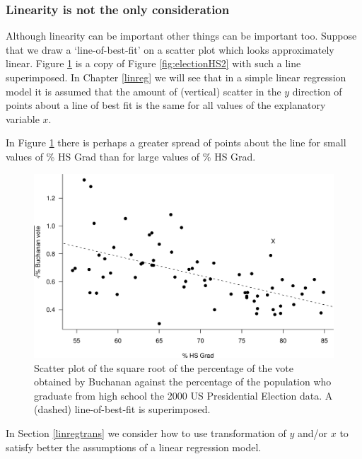 \documentclass[
  11pt,
  british,
  openany, a4paper]{book}
\begin{document}
\hypertarget{linearity-is-not-the-only-consideration}{%
\subsubsection*{Linearity is not the only consideration}\label{linearity-is-not-the-only-consideration}}

Although linearity can be important other things can be important too. Suppose that we draw a `line-of-best-fit' on a scatter plot which looks approximately linear. Figure \ref{fig:electionHS3} is a copy of Figure \ref{fig:electionHS2} with such a line superimposed. In Chapter \ref{linreg} we will see that in a simple linear regression model it is assumed that the amount of (vertical) scatter in the \(y\) direction of points about a line of best fit is the same for all values of the explanatory variable \(x\).

In Figure \ref{fig:electionHS3} there is perhaps a greater spread of points about the line for small values of \% HS Grad than for large values of \% HS Grad.

\begin{figure}

{\centering \includegraphics[width=0.75\linewidth]{images/election_HS3} 

}

\caption{Scatter plot of the square root of the percentage of the vote obtained by Buchanan against the percentage of the population who graduate from high school the 2000 US Presidential Election data.  A (dashed) line-of-best-fit is superimposed.}\label{fig:electionHS3}
\end{figure}

In Section \ref{linregtrans} we consider how to use transformation of \(y\) and/or \(x\) to satisfy better the assumptions of a linear regression model.
\end{document}
